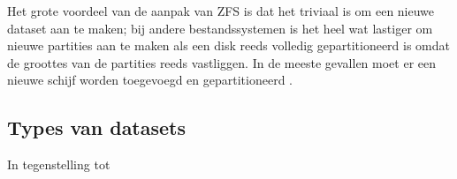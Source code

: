 Het grote voordeel van de aanpak van ZFS is dat het triviaal is om een nieuwe dataset aan te maken; bij andere bestandssystemen is het heel wat lastiger om nieuwe partities aan te maken als een disk reeds volledig gepartitioneerd is omdat de groottes van de partities reeds vastliggen. In de meeste gevallen moet er een nieuwe schijf worden toegevoegd en gepartitioneerd \autocite{FBSDDP2017}.

\subsection{Types van datasets}

In tegenstelling tot 

